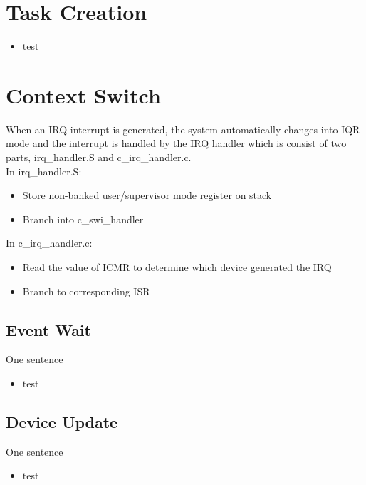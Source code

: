 \documentclass{article}
\begin{document}
\section{Task Creation}
\begin{itemize}
	\setlength{\itemsep}{1pt}
	\setlength{\parskip}{0pt}
	\setlength{\parsep}{0pt}
	\item test
\end{itemize}

\section{Context Switch}
When an IRQ interrupt is generated, the system automatically changes into IQR mode and the interrupt is handled by the IRQ handler which is consist of two parts, irq\_handler.S and c\_irq\_handler.c.\\
In irq\_handler.S:
	 \begin{itemize}
	  \setlength{\itemsep}{1pt}
	  \setlength{\parskip}{0pt}
	  \setlength{\parsep}{0pt}
	\item Store non-banked user/supervisor mode register on stack
	\item Branch into c\_swi\_handler
	\end{itemize}
In c\_irq\_handler.c:
	\begin{itemize}
	  \setlength{\itemsep}{1pt}
	  \setlength{\parskip}{0pt}
	  \setlength{\parsep}{0pt}
	\item Read the value of ICMR to determine which device generated the IRQ 
	\item Branch to corresponding ISR
\end{itemize}

\subsection{Event Wait}	
One sentence

 \begin{itemize}
	  \setlength{\itemsep}{1pt}
	  \setlength{\parskip}{0pt}
	  \setlength{\parsep}{0pt}
	  \item test
\end{itemize}

\subsection{Device Update}	
One sentence
 \begin{itemize}
	  \setlength{\itemsep}{1pt}
	  \setlength{\parskip}{0pt}
	  \setlength{\parsep}{0pt}
	  \item test
\end{itemize}
\end{document}
